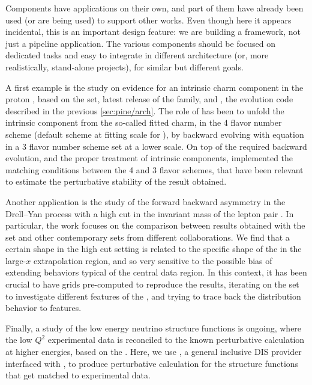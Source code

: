 
Components have applications on their own, and part of them have already been
used (or are being used) to support other works.
Even though here it appears incidental, this is an important design feature: we
are building a framework, not just a pipeline application. The
various components should be focused on dedicated tasks and easy to integrate
in different architecture (or, more realistically, stand-alone projects), for
similar but different goals.

A first example is the study on evidence
for an intrinsic charm component in the proton \cite{Ball:2022qks}, based on
the  \pdf set, latest release of the \nnpdf family, and \eko
\cite{Candido:2022tld}, the evolution code described in the previous
\cref{sec:pine/arch}.
The role of \eko has been to unfold the intrinsic component from the so-called
fitted charm, in the 4 flavor number scheme (default scheme at fitting scale
for \nnpdf), by backward evolving with \dglap equation in a 3 flavor number
scheme \pdf set at a lower scale.
On top of the required backward evolution, and the proper treatment of
intrinsic components,
\eko implemented the \nnnlo matching conditions
between the 4 and 3 flavor schemes, that have been relevant to estimate the
perturbative stability of the result obtained.

Another application is the study of the forward backward asymmetry in the
Drell--Yan process with a high cut in the invariant mass of the
lepton pair \cite{Ball:2022qtp}.
In particular, the work focuses on the comparison between results obtained with
the  \pdf set and other contemporary \pdf sets from different
collaborations. We find that a certain shape in the high cut setting is
related to the specific shape of the \pdfs in the large-$x$ extrapolation
region, and so very sensitive to the possible bias of extending behaviors
typical of the central data region.
In this context, it has been crucial to have \pineappl \cite{Carrazza:2020gss}
\cite{christopher_schwan_2022_7145377} grids pre-computed to reproduce the
results, iterating on the \pdf set to investigate different features of the
\pdf, and trying to trace back the distribution behavior to \pdf features.

Finally, a study of the low energy neutrino structure functions is ongoing,
where the low $Q^2$ experimental data is reconciled to the known
perturbative calculation at higher energies, based on the \pdfs.
Here, we use \yadism, a general inclusive DIS provider
interfaced with \pineappl, to produce perturbative \qcd calculation for the
structure functions that get matched to experimental data.
